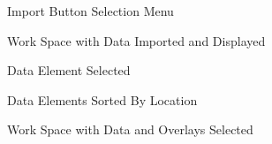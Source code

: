 \documentclass[onecolumn, draftclsnofoot,10pt, compsoc]{IEEEtran}
\begin{document}
\begin{singlespace}
        \begin{figure}[H]
        \caption{Import Button Selection Menu}
        \label{fig:Mockup2}
        \end{figure}
        
        \begin{figure}[H]
        \caption{Work Space with Data Imported and Displayed}
        \label{fig:Mockup3}
        \end{figure}
        
        \begin{figure}[H]
        \caption{Data Element Selected}
        \label{fig:Mockup4}
        \end{figure}
        
        \begin{figure}[H]
        \caption{Data Elements Sorted By Location}
        \label{fig:Mockup5}
        \end{figure}
        
        \begin{figure}[H]
        \caption[Work Space with Data and Overlays Selected]{Work Space with Data and Overlays Selected\cite{windyMap}}
        \label{fig:Mockup6}
        \end{figure}
\renewcommand\refname{Bibliography}

\pagebreak
\nocite{*}%



\end{singlespace}
\end{document}
